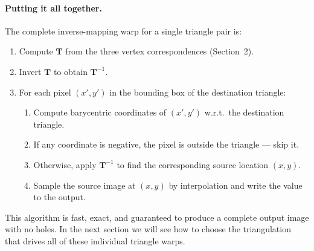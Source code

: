 \paragraph{Putting it all together.}\label{sec:inverse-mapping}
The complete inverse-mapping warp for a single triangle pair is:
\begin{enumerate}
    \item Compute $\mathbf{T}$ from the three vertex correspondences (Section~2).
    \item Invert $\mathbf{T}$ to obtain $\mathbf{T}^{-1}$.
    \item For each pixel $(x', y')$ in the bounding box of the destination triangle:
    \begin{enumerate}
        \item Compute barycentric coordinates of $(x', y')$ w.r.t.\ the destination triangle.
        \item If any coordinate is negative, the pixel is outside the triangle --- skip it.
        \item Otherwise, apply $\mathbf{T}^{-1}$ to find the corresponding source location $(x, y)$.
        \item Sample the source image at $(x, y)$ by interpolation and write the value to the output.
    \end{enumerate}
\end{enumerate}

This algorithm is fast, exact, and guaranteed to produce a complete output image with no holes.  In the next section we will see how to choose the triangulation that drives all of these individual triangle warps.
